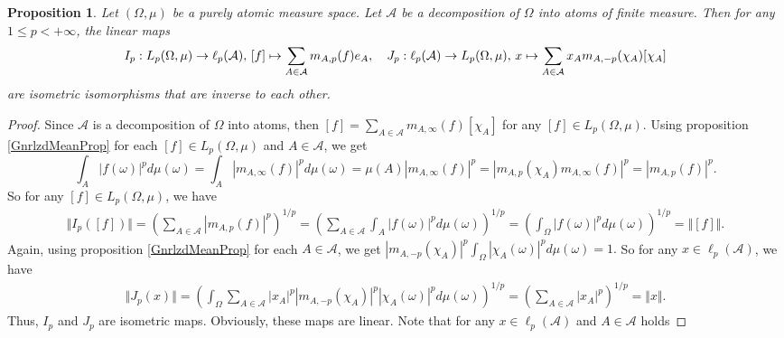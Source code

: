 \documentclass[12pt]{article}
\newtheorem{proposition}[theorem]{Proposition}
\begin{document}
\begin{proposition}\label{LpOnPurAtomMeasSpRepr}
    Let $(\Omega,\mu)$ be a purely atomic measure space. Let $\mathcal{A}$ be a 
    decomposition of $\Omega$ into atoms of finite measure. Then for 
    any $1\leq p<+\infty$, the linear maps
    \[
        I_p:
        L_p(\Omega,\mu)\to \ell_p(\mathcal{A}),\,
        [f]\mapsto\sum_{A\in\mathcal{A}} m_{A,p}(f) e_A, 
        \quad
        J_p:
        \ell_p(\mathcal{A})\to L_p(\Omega,\mu),\,
        x\mapsto\sum_{A\in\mathcal{A}} x_A m_{A,-p}(\chi_A) [\chi_A]\\
    \]
    are isometric isomorphisms that are inverse to each other.
\end{proposition}
\begin{proof} 
    Since $\mathcal{A}$ is a decomposition of $\Omega$ into atoms, then
    $
        [f]=\sum_{A\in\mathcal{A}} m_{A,\infty}(f)[\chi_A]
    $
    for any $[f]\in L_p(\Omega,\mu)$. Using proposition \ref{GnrlzdMeanProp} for 
    each $[f]\in L_p(\Omega,\mu)$ and $A\in\mathcal{A}$, we get
    \[
        \int_A |f(\omega)|^pd\mu(\omega)
        =\int_A\left|m_{A,\infty}(f)\right|^pd\mu(\omega)
        =\mu(A)\left|m_{A,\infty}(f)\right|^p
        =\left|m_{A,p}(\chi_A) m_{A,\infty}(f)\right|^p
        =|m_{A,p}(f)|^p.
    \]
    So for any $[f]\in L_p(\Omega,\mu)$, we have
    \[
    \begin{aligned}
        \Vert I_p([f])\Vert
        =\left( \sum_{A\in\mathcal{A}} |m_{A,p}(f)|^p\right)^{1/p} 
        =\left( 
            \sum_{A\in\mathcal{A}} \int_A |f(\omega)|^pd\mu(\omega)
        \right)^{1/p} 
        =\left( \int_{\Omega} |f(\omega)|^pd\mu(\omega)\right)^{1/p} 
        =\Vert [f]\Vert.
    \end{aligned}
    \]
    Again, using proposition \ref{GnrlzdMeanProp} for each $A\in\mathcal{A}$, 
    we get
    $
        |m_{A,-p}(\chi_A)|^p \int_{\Omega} |\chi_A(\omega)|^p d\mu(\omega)
        =1.
    $ 
    So for any $x\in\ell_p(\mathcal{A})$, we have
    \[
    \begin{aligned}
        \Vert J_p(x)\Vert
        =\left(
            \int_{\Omega}
                \sum_{A\in\mathcal{A}}
                |x_A|^p|m_{A,-p}(\chi_A)|^p|\chi_A(\omega)|^p 
            d\mu(\omega)
        \right)^{1/p} 
        =\left(\sum_{A\in\mathcal{A}} |x_A|^p \right)^{1/p} 
        =\Vert x\Vert.
    \end{aligned}
    \]
    Thus, $I_p$ and $J_p$ are isometric maps. Obviously, these maps are linear. 
    Note that for any $x\in\ell_p(\mathcal{A})$ and $A\in\mathcal{A}$ holds

\end{proof}
\end{document}
